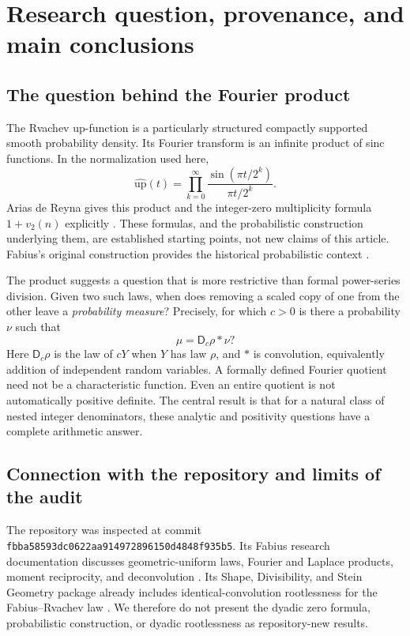 \documentclass[11pt,a4paper]{article}
\theoremstyle{definition}
\theoremstyle{remark}
\newcommand{\D}{\mathsf D}
\newcommand{\sourcecommit}{\texttt{fbba58593dc0622aa914972896150d4848f935b5}}
\begin{document}
\hypersetup{pageanchor=true}

\begingroup
\small
\setlength{\parskip}{0pt}
\tableofcontents
\endgroup
\newpage

\section{Research question, provenance, and main conclusions}
\label{sec:introduction}

\subsection{The question behind the Fourier product}
The Rvachev up-function is a particularly structured compactly supported
smooth probability density. Its Fourier transform is an infinite product
of sinc functions. In the normalization used here,
\begin{equation}\label{eq:up-product}
 \widehat{\mathrm{up}}(t)=\prod_{k=0}^{\infty}
 \frac{\sin(\pi t/2^k)}{\pi t/2^k}.
\end{equation}
Arias de Reyna gives this product and the integer-zero multiplicity formula
$1+v_2(n)$ explicitly \cite{arias}. These formulas, and the probabilistic
construction underlying them, are established starting points, not new
claims of this article. Fabius's original construction provides the
historical probabilistic context \cite{fabius}.

The product suggests a question that is more restrictive than formal
power-series division. Given two such laws, when does removing a scaled
copy of one from the other leave a \emph{probability measure}? Precisely,
for which $c>0$ is there a probability $\nu$ such that
\begin{equation}\label{eq:factor-question}
 \mu=\D_c\rho*\nu?
\end{equation}
Here $\D_c\rho$ is the law of $cY$ when $Y$ has law $\rho$, and $*$ is
convolution, equivalently addition of independent random variables.
A formally defined Fourier quotient need not be a characteristic function.
Even an entire quotient is not automatically positive definite. The
central result is that for a natural class of nested integer denominators,
these analytic and positivity questions have a complete arithmetic answer.

\subsection{Connection with the repository and limits of the audit}
The repository was inspected at commit \sourcecommit.
Its Fabius research documentation discusses geometric-uniform laws,
Fourier and Laplace products, moment reciprocity, and deconvolution
\cite{repo-inverse}. Its Shape, Divisibility, and Stein Geometry package
already includes identical-convolution rootlessness for the Fabius--Rvachev
law \cite{repo-shape}. We therefore do not present the dyadic zero formula,
probabilistic construction, or dyadic rootlessness as repository-new results.
\end{document}
